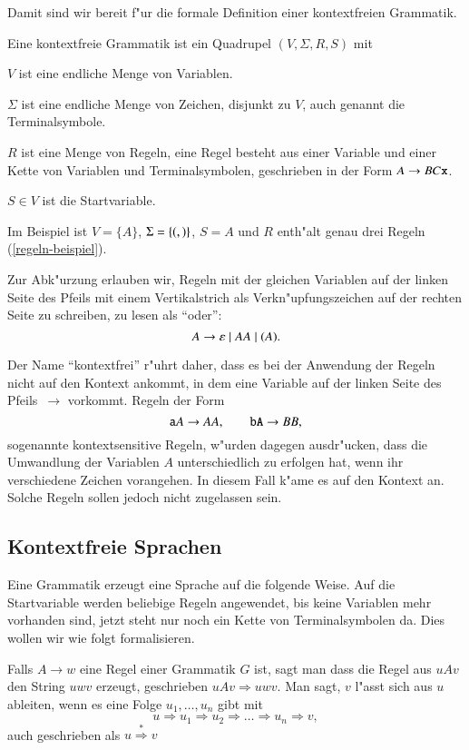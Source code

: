 Damit sind wir bereit f"ur die formale Definition einer kontextfreien
Grammatik.
\begin{definition}
Eine kontextfreie Grammatik ist ein Quadrupel $(V,\Sigma,R,S)$ mit
\begin{compactenum}
\item $V$ ist eine endliche Menge von Variablen.
\item $\Sigma$ ist eine endliche Menge von Zeichen, disjunkt zu $V$,
auch genannt die Terminalsymbole.
\item $R$ ist eine Menge von Regeln, eine Regel besteht aus einer
Variable und einer Kette von Variablen und Terminalsymbolen, geschrieben
in der Form $A\to BC{\tt x}$.
\item $S\in V$ ist die Startvariable.
\end{compactenum}
\end{definition}
Im Beispiel ist $V=\{A\}$, $\Sigma=\{{\tt (},{\tt )}\}$, $S=A$ und
$R$ enth"alt genau drei Regeln (\ref{regeln-beispiel}).

Zur Abk"urzung erlauben wir, Regeln mit der gleichen Variablen
auf der linken Seite des Pfeils mit einem Vertikalstrich als
Verkn"upfungszeichen auf der rechten Seite zu schreiben, zu lesen
als ``oder'':
\[
A \to \varepsilon\;|\; AA\;|\; {\tt (}A{\tt )}.
\]

Der Name ``kontextfrei'' r"uhrt daher, dass es bei der Anwendung
der Regeln nicht auf den Kontext ankommt, in dem eine Variable
auf der linken Seite des Pfeils~$\rightarrow$ vorkommt. Regeln der
Form 
\[
{\tt a}A\to AA, \qquad {\tt bA}\to BB,
\]
sogenannte kontextsensitive Regeln,
w"urden dagegen ausdr"ucken, dass die Umwandlung der Variablen $A$
unterschiedlich zu erfolgen hat, wenn ihr verschiedene Zeichen
vorangehen. In diesem Fall k"ame es auf den Kontext an. Solche
Regeln sollen jedoch nicht zugelassen sein.

\subsection{Kontextfreie Sprachen}
Eine Grammatik erzeugt eine Sprache auf die folgende Weise.
Auf die Startvariable werden beliebige Regeln angewendet,
bis keine Variablen mehr vorhanden sind, jetzt steht nur noch
ein Kette von Terminalsymbolen da. Dies wollen wir wie folgt
formalisieren.

\begin{definition}
Falls $A\to w$ eine Regel einer Grammatik $G$ ist, sagt man
dass die Regel aus $uAv$ den String $uwv$ erzeugt,
geschrieben $uAv\Rightarrow uwv$. Man sagt, $v$ l"asst sich aus
$u$ ableiten, wenn es eine Folge $u_1,\dots,u_n$ gibt mit
\[
u\Rightarrow u_1\Rightarrow u_2\Rightarrow\dots\Rightarrow u_n\Rightarrow v,
\]
auch geschrieben als $u\overset{*}{\Rightarrow} v$
\end{definition}


